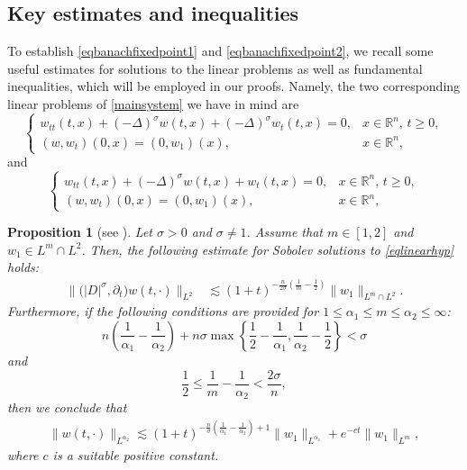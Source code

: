 \documentclass[11pt,reqno]{amsart}
\numberwithin{equation}{section}
\newtheorem{proposition}[theorem]{Proposition}
\begin{document}
\subsection{Key estimates and inequalities} To establish \eqref{eqbanachfixedpoint1} and \eqref{eqbanachfixedpoint2}, we recall some useful estimates for solutions to the linear problems as well as fundamental inequalities, which will be employed in our proofs. Namely, the two corresponding linear problems of \eqref{mainsystem} we have in mind are
\begin{equation}\label{eqlinearhyp}
\begin{cases}
    w_{tt}(t,x)+(-\Delta)^{\sigma}w(t,x)+(-\Delta)^{\sigma}w_t(t,x)=0, &x\in \mathbb{R}^n,\,t\geq 0,\\
    (w,w_t)(0,x)=(0,w_1)(x), &x\in \mathbb{R}^n,
\end{cases}
\end{equation}
and 
\begin{equation}\label{eqlinearpar}
\begin{cases}
    w_{tt}(t,x)+(-\Delta)^{\sigma}w(t,x)+w_t(t,x)=0, &x\in \mathbb{R}^n,\,t\geq 0,\\
    (w,w_t)(0,x)=(0,w_1)(x), &x\in \mathbb{R}^n,
\end{cases}
\end{equation}
\begin{proposition}[see \cite{DAbEbe2021}] \label{Linear estimates hyp} Let $\sigma>0$ and $\sigma\ne 1$. Assume that $m \in [1,2]$ and $w_1 \in L^m \cap L^2$. Then, the following estimate for Sobolev solutions to \eqref{eqlinearhyp} holds:
\begin{align*}
    \|\big(|D|^{\sigma},\partial_t\big)w(t,\cdot)\|_{L^2} &\lesssim (1+t)^{-\frac{n}{2\sigma}(\frac{1}{m}-\frac{1}{2})} \|w_1\|_{L^m \cap L^2}.
\end{align*}
Furthermore, if the following conditions are provided for $1 \leq \alpha_1 \leq m \leq \alpha_2 \leq \infty$:
$$ n\left(\frac{1}{\alpha_1}-\frac{1}{\alpha_2}\right)+n\sigma \max\left\{\frac{1}{2}-\frac{1}{\alpha_1}, \frac{1}{\alpha_2}-\frac{1}{2}\right\} < \sigma $$
and
$$ \frac{1}{2} \leq \frac{1}{m}-\frac{1}{\alpha_2} < \frac{2\sigma}{n}, $$
then we conclude that
\begin{align*}
    \|w(t,\cdot)\|_{L^{\alpha_2}} \lesssim (1+t)^{-\frac{n}{\sigma}(\frac{1}{\alpha_1}-\frac{1}{\alpha_2})+1}\|w_1\|_{L^{\alpha_1}} + e^{-ct} \|w_1\|_{L^m},
\end{align*}
where $c$ is a suitable positive constant.
\end{proposition}
\end{document}

